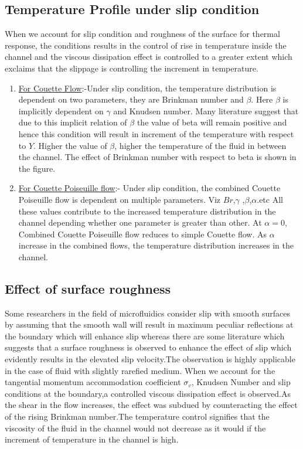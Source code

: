 \documentclass[14pt,one side, a4paper]{extbook}
\begin{document}
	 	\subsection{Temperature Profile under slip condition} 
	 	When we account for slip condition and roughness of the surface for thermal response, the conditions results in the control of rise in temperature inside the channel and the viscous dissipation effect is controlled to a greater extent which exclaims that the slippage is controlling the increment in temperature.
	 		 	\begin{enumerate}
	 		\item {\underline{For Couette Flow}:-}Under slip condition, the temperature distribution is dependent on two parameters, they are Brinkman number and $\beta$. Here $\beta$ is implicitly dependent on $\gamma$ and Knudsen  number. Many literature suggest that due to this implicit relation of $\beta$ the value of beta will remain positive and hence this condition will result in increment of the temperature with respect to $Y$. Higher the value of $\beta$, higher the temperature of the fluid in between the channel. The effect of Brinkman number with respect to beta is shown in the figure.
	 		\item {\underline{For Couette Poiseuille flow}:-}
	 		Under slip condition, the combined Couette Poiseuille  flow is dependent on multiple parameters. Viz $Br$,$\gamma$ ,$\beta$,$\alpha$.etc
	 		All these values contribute to the increased temperature distribution in the channel depending whether one parameter is greater than other.
	 		At $\alpha=0$, Combined Couette Poiseuille flow reduces to simple Couette flow. As $\alpha$ increase in the combined flows, the temperature distribution increases in the channel.
	 	\end{enumerate}
	 	\subsection{Effect of surface roughness}
	 	Some\hspace*{0.2cm} researchers\hspace*{0.2cm} in\hspace*{0.2cm} the field of microfluidics consider slip with smooth surfaces by assuming that the smooth wall will result in maximum peculiar reflections at the boundary which will enhance slip whereas there are some literature which suggests that a surface roughness is observed to enhance the effect of slip which evidently results in the elevated slip velocity\cite{shams}.The observation is highly applicable in the case of fluid with slightly rarefied medium.
	 	When we account for the tangential momentum accommodation coefficient $\sigma_{v}$, Knudsen Number and slip conditions at the boundary,a controlled viscous dissipation effect is observed.As the shear in the flow increases, the effect was subdued by counteracting the effect of the rising Brinkman number.The temperature control signifies that the viscosity of the fluid in the channel would not decrease as it would if the increment of temperature in the channel is high.
\end{document}
